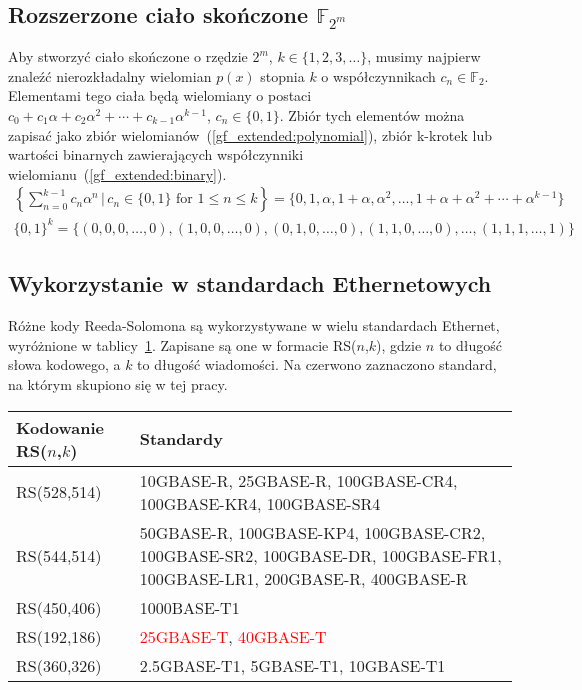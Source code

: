 \subsection{Rozszerzone ciało skończone $\mathbb{F}_{2^m}$}

Aby stworzyć ciało skończone o rzędzie $2^m$, $k \in \{ 1, 2, 3, \ldots \}$, musimy
najpierw znaleźć nierozkładalny wielomian $p(x)$ stopnia $k$ o współczynnikach
$c_{n} \in \mathbb{F}_{2}$.
Elementami tego ciała będą wielomiany o postaci $c_{0} + c_{1}\alpha + c_{2}\alpha^{2} +
    \cdots + c_{k-1}\alpha^{k-1}$, $c_{n} \in \{0, 1\}$.
Zbiór tych elementów można zapisać jako zbiór wielomianów~(\ref{gf_extended:polynomial}),
zbiór k-krotek lub wartości binarnych zawierających współczynniki
wielomianu~(\ref{gf_extended:binary}).
\begin{align}
    \left\{ \sum_{n=0}^{k-1} c_{n}\alpha^{n} \,|\, c_{n} \in \{0,1\} \text{ for } 1 \le n \le k \right\}
        = \{ 0, 1, \alpha, 1 + \alpha, \alpha^{2}, \ldots, 1 + \alpha + \alpha^2 + \cdots + \alpha^{k-1} \}
        \label{gf_extended:polynomial} \\
    \{ 0, 1 \}^{k} = \{ (0, 0, 0, \ldots, 0), (1, 0, 0, \ldots, 0), (0, 1, 0, \ldots, 0),
    (1, 1, 0, \ldots, 0), \ldots, (1, 1, 1, \ldots, 1) \} \label{gf_extended:binary}
\end{align}

\subsection{Wykorzystanie w standardach Ethernetowych}

Różne kody Reeda-Solomona są wykorzystywane w wielu standardach Ethernet,
wyróżnione w tablicy~\ref{standards:title}. Zapisane są one w formacie RS($n$,$k$),
gdzie $n$ to długość słowa kodowego, a $k$ to długość wiadomości.
Na czerwono zaznaczono standard, na którym skupiono się w tej pracy.

\begingroup
{}
\begin{table}[h]
\label{standards:title}
\centering
    \begin{tabular}{m{3cm} m{9cm}}
    \toprule
    Kodowanie RS($n$,$k$)    & Standardy \\
    \midrule
    RS(528,514)     & 10GBASE-R, 25GBASE-R, 100GBASE-CR4, 100GBASE-KR4, 100GBASE-SR4 \\
    \midrule
    RS(544,514)     & 50GBASE-R, \;\; 100GBASE-KP4, 100GBASE-CR2, 100GBASE-SR2,
    \; 100GBASE-DR, 100GBASE-FR1, 100GBASE-LR1, \hfill \; 200GBASE-R, \hfill 400GBASE-R \\
    \midrule
    RS(450,406)     & 1000BASE-T1 \\
    \midrule
    RS(192,186)     & \textcolor{red}{25GBASE-T}, \;\;\;\;\;\;\;\;\;\;\;\;\; \textcolor{red}{40GBASE-T} \\
    \midrule
    RS(360,326)     & 2.5GBASE-T1, \hfill 5GBASE-T1, \hfill 10GBASE-T1 \\
    \bottomrule
    \end{tabular}
\end{table}
\endgroup

